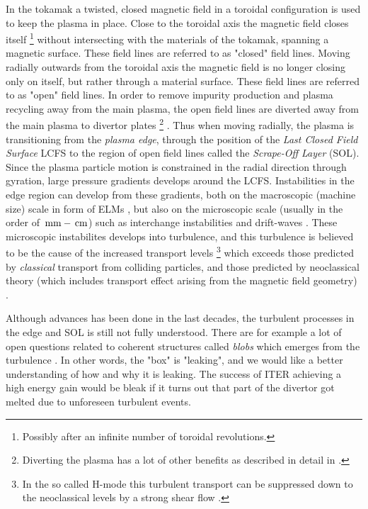 In the tokamak a twisted, closed magnetic field in a toroidal configuration is used to keep the plasma in place.
Close to the toroidal axis the magnetic field closes itself
%
\footnote{Possibly after an infinite number of toroidal revolutions.}
%
without intersecting with the materials of the tokamak, spanning a magnetic surface.
These field lines are referred to as "closed" field lines.
Moving radially outwards from the toroidal axis the magnetic field is no longer closing only on itself, but rather through a material surface.
These field lines are referred to as "open" field lines.
In order to remove impurity production and plasma recycling away from the main plasma, the open field lines are diverted away from the main plasma to divertor plates%
%
\footnote{Diverting the plasma has a lot of other benefits as described in detail in \cite{Stangeby2000book,Stacey2012book}.}%
%
.
Thus when moving radially, the plasma is transitioning from the \emph{plasma edge}, through the position of the \emph{Last Closed Field Surface} LCFS to the region of open field lines called the \emph{Scrape-Off Layer} (SOL).
Since the plasma particle motion is constrained in the radial direction through gyration, large pressure gradients develops around the LCFS.
Instabilities in the edge region can develop from these gradients, both on the macroscopic (machine size) scale in form of ELMs \cite{Zohm1996}, but also on the microscopic scale (usually in the order of $\, \text{mm} - \, \text{cm}$) such as interchange instabilities \cite{Scott2005b} and drift-waves \cite{Tynan2009}.
These microscopic instabilites develops into turbulence, and this turbulence is believed to be the cause of the increased transport levels
%
\footnote{In the so called H-mode this turbulent transport can be suppressed down to the neoclassical levels by a strong shear flow \cite{Burrell1997}.}%
%
which exceeds those predicted by \emph{classical} transport from colliding particles, and those predicted by neoclassical theory (which includes transport effect arising from the magnetic field geometry) \cite{Wootton1990}.

Although advances has been done in the last decades, the turbulent processes in the edge and SOL is still not fully understood.
There are for example a lot of open questions related to coherent structures called \emph{blobs} which emerges from the turbulence \cite{DIppolito2011}.
In other words, the "box" is "leaking", and we would like a better understanding of how and why it is leaking.
The success of ITER achieving a high energy gain would be bleak if it turns out that part of the divertor got melted due to unforeseen turbulent events.

